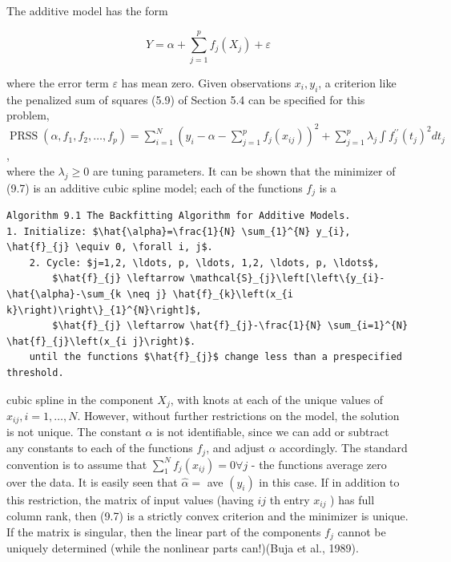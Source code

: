 \documentclass[10pt]{article}
\begin{document}
The additive model has the form


\begin{equation*}
Y=\alpha+\sum_{j=1}^{p} f_{j}\left(X_{j}\right)+\varepsilon \tag{9.6}
\end{equation*}


where the error term $\varepsilon$ has mean zero. Given observations $x_{i}, y_{i}$, a criterion like the penalized sum of squares (5.9) of Section 5.4 can be specified for this problem,\\
$\operatorname{PRSS}\left(\alpha, f_{1}, f_{2}, \ldots, f_{p}\right)=\sum_{i=1}^{N}\left(y_{i}-\alpha-\sum_{j=1}^{p} f_{j}\left(x_{i j}\right)\right)^{2}+\sum_{j=1}^{p} \lambda_{j} \int f_{j}^{\prime \prime}\left(t_{j}\right)^{2} d t_{j}$,\\
where the $\lambda_{j} \geq 0$ are tuning parameters. It can be shown that the minimizer of (9.7) is an additive cubic spline model; each of the functions $f_{j}$ is a

\begin{verbatim}
Algorithm 9.1 The Backfitting Algorithm for Additive Models.
1. Initialize: $\hat{\alpha}=\frac{1}{N} \sum_{1}^{N} y_{i}, \hat{f}_{j} \equiv 0, \forall i, j$.
    2. Cycle: $j=1,2, \ldots, p, \ldots, 1,2, \ldots, p, \ldots$,
        $\hat{f}_{j} \leftarrow \mathcal{S}_{j}\left[\left\{y_{i}-\hat{\alpha}-\sum_{k \neq j} \hat{f}_{k}\left(x_{i k}\right)\right\}_{1}^{N}\right]$,
        $\hat{f}_{j} \leftarrow \hat{f}_{j}-\frac{1}{N} \sum_{i=1}^{N} \hat{f}_{j}\left(x_{i j}\right)$.
    until the functions $\hat{f}_{j}$ change less than a prespecified threshold.
\end{verbatim}

cubic spline in the component $X_{j}$, with knots at each of the unique values of $x_{i j}, i=1, \ldots, N$. However, without further restrictions on the model, the solution is not unique. The constant $\alpha$ is not identifiable, since we can add or subtract any constants to each of the functions $f_{j}$, and adjust $\alpha$ accordingly. The standard convention is to assume that $\sum_{1}^{N} f_{j}\left(x_{i j}\right)= 0 \forall j$ - the functions average zero over the data. It is easily seen that $\hat{\alpha}=$ ave $\left(y_{i}\right)$ in this case. If in addition to this restriction, the matrix of input values (having $i j$ th entry $x_{i j}$ ) has full column rank, then (9.7) is a strictly convex criterion and the minimizer is unique. If the matrix is singular, then the linear part of the components $f_{j}$ cannot be uniquely determined (while the nonlinear parts can!)(Buja et al., 1989).
\end{document}
